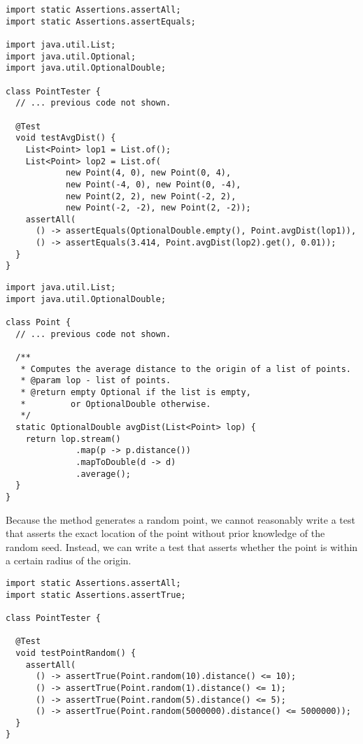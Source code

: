 \begin{lstlisting}[language=MyJava]
import static Assertions.assertAll;
import static Assertions.assertEquals;

import java.util.List;
import java.util.Optional;
import java.util.OptionalDouble;

class PointTester {
  // ... previous code not shown.

  @Test
  void testAvgDist() {
    List<Point> lop1 = List.of();
    List<Point> lop2 = List.of(
            new Point(4, 0), new Point(0, 4),
            new Point(-4, 0), new Point(0, -4),
            new Point(2, 2), new Point(-2, 2),
            new Point(-2, -2), new Point(2, -2));
    assertAll(
      () -> assertEquals(OptionalDouble.empty(), Point.avgDist(lop1)),
      () -> assertEquals(3.414, Point.avgDist(lop2).get(), 0.01));
  }
}
\end{lstlisting}

\begin{lstlisting}[language=MyJava]
import java.util.List;
import java.util.OptionalDouble;

class Point {
  // ... previous code not shown. 

  /**
   * Computes the average distance to the origin of a list of points.
   * @param lop - list of points.
   * @return empty Optional if the list is empty, 
   *         or OptionalDouble otherwise.
   */
  static OptionalDouble avgDist(List<Point> lop) {
    return lop.stream()
              .map(p -> p.distance())
              .mapToDouble(d -> d)
              .average();
  }
}
\end{lstlisting}


Because the  method generates a random point, we cannot reasonably write a test that asserts the exact location of the point without prior knowledge of the random seed. 
Instead, we can write a test that asserts whether the point is within a certain radius of the origin. 

\begin{lstlisting}[language=MyJava]
import static Assertions.assertAll;
import static Assertions.assertTrue;

class PointTester {

  @Test
  void testPointRandom() {
    assertAll(
      () -> assertTrue(Point.random(10).distance() <= 10);
      () -> assertTrue(Point.random(1).distance() <= 1);
      () -> assertTrue(Point.random(5).distance() <= 5);
      () -> assertTrue(Point.random(5000000).distance() <= 5000000));
  }
}
\end{lstlisting}


